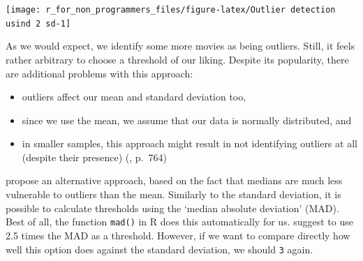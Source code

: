 \documentclass[
]{book}
\begin{document}
\begin{center}\texttt{[image: r\_for\_non\_programmers\_files/figure-latex/Outlier detection usind 2 sd-1]} \end{center}

As we would expect, we identify some more movies as being outliers. Still, it feels rather arbitrary to choose a threshold of our liking. Despite its popularity, there are additional problems with this approach:

\begin{itemize}
\item
  outliers affect our mean and standard deviation too,
\item
  since we use the mean, we assume that our data is normally distributed, and
\item
  in smaller samples, this approach might result in not identifying outliers at all (despite their presence) (\citet{leys2013detecting}, p.~764)
\end{itemize}

\citet{leys2013detecting} propose an alternative approach, based on the fact that medians are much less vulnerable to outliers than the mean. Similarly to the standard deviation, it is possible to calculate thresholds using the `median absolute deviation' (MAD). Best of all, the function \texttt{mad()} in R does this automatically for us. \citet{leys2013detecting} suggest to use 2.5 times the MAD as a threshold. However, if we want to compare directly how well this option does against the standard deviation, we should \texttt{3} again.
\end{document}
